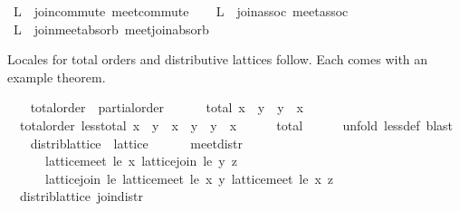 \begin{isabellebody}
\ L{}\ {\isacharequal}\ join{\isacharunderscore}commute\ meet{\isacharunderscore}commute\isanewline
\ \ \isamarkupfalse%
\ L{}\ {\isacharequal}\ join{\isacharunderscore}assoc\ meet{\isacharunderscore}assoc\isanewline
\ \ \isanewline
\ \ \isamarkupfalse%
\ L{}\ {\isacharequal}\ join{\isacharunderscore}meet{\isacharunderscore}absorb\ meet{\isacharunderscore}join{\isacharunderscore}absorb%
\endisataginvisible
{\isafoldinvisible}%
%
\isadeliminvisible
\isanewline
%
\endisadeliminvisible
\isanewline
\ \ \isamarkupfalse%
%
\begin{isamarkuptext}%
Locales for total orders and distributive lattices follow.
  Each comes with an example theorem.%
\end{isamarkuptext}%
\isamarkuptrue%
\ \ \isamarkupfalse%
\ total{\isacharunderscore}order\ {\isacharequal}\ partial{\isacharunderscore}order\ {\isacharplus}\isanewline
\ \ \ \ \ total{\isacharcolon}\ {\isachardoublequoteopen}x\ {\isasymsqsubseteq}\ y\ {\isasymor}\ y\ {\isasymsqsubseteq}\ x{\isachardoublequoteclose}\isanewline
\isanewline
\ \ \isamarkupfalse%
\ {\isacharparenleft}\ total{\isacharunderscore}order{\isacharparenright}\ less{\isacharunderscore}total{\isacharcolon}\ {\isachardoublequoteopen}x\ {\isasymsqsubset}\ y\ {\isasymor}\ x\ {\isacharequal}\ y\ {\isasymor}\ y\ {\isasymsqsubset}\ x{\isachardoublequoteclose}\isanewline
%
\isadelimproof
\ \ \ \ %
\endisadelimproof
%
\isatagproof
{}\isamarkupfalse%
\ total\isanewline
\ \ \ \ \isamarkupfalse%
\ {\isacharparenleft}unfold\ less{\isacharunderscore}def{\isacharparenright}\ blast%
\endisatagproof
{\isafoldproof}%
%
\isadelimproof
\isanewline
%
\endisadelimproof
\isanewline
\ \ \isamarkupfalse%
\ distrib{\isacharunderscore}lattice\ {\isacharequal}\ lattice\ {\isacharplus}\isanewline
\ \ \ \ \ meet{\isacharunderscore}distr{\isacharcolon}\isanewline
\ \ \ \ \ \ {\isachardoublequoteopen}lattice{\isachardot}meet\ le\ x\ {\isacharparenleft}lattice{\isachardot}join\ le\ y\ z{\isacharparenright}\ {\isacharequal}\isanewline
\ \ \ \ \ \ lattice{\isachardot}join\ le\ {\isacharparenleft}lattice{\isachardot}meet\ le\ x\ y{\isacharparenright}\ {\isacharparenleft}lattice{\isachardot}meet\ le\ x\ z{\isacharparenright}{\isachardoublequoteclose}\isanewline
\isanewline
\ \ \isamarkupfalse%
\ {\isacharparenleft}\ distrib{\isacharunderscore}lattice{\isacharparenright}\ join{\isacharunderscore}distr{\isacharcolon}\isanewline

\end{isabellebody}
